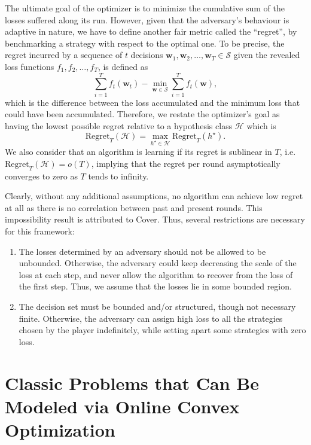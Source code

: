 \documentclass{article}
\begin{document}
The ultimate goal of the optimizer is to minimize the cumulative sum of the losses suffered along its run. However, given that the adversary's behaviour is adaptive in nature, we have to define another fair metric called the ``regret'', by benchmarking a strategy with respect to the optimal one.
To be precise, the regret incurred by a sequence of $t$ decisions $\textbf{w}_1, \textbf{w}_2, \ldots, \textbf{w}_T\in\mathcal{S}$ given the revealed loss functions $f_1, f_2, \ldots, f_T$, is defined as \[\sum\limits_{i=1}^T f_t(\textbf{w}_t)-\min\limits_{\textbf{w}\in\mathcal{S}} \sum\limits_{i=1}^T f_t(\textbf{w}),\] which is the difference between the loss accumulated and the minimum loss that could have been accumulated.
Therefore, we restate the optimizer's goal as having the lowest possible regret relative to a hypothesis class $\mathcal{H}$ which is \[\text{Regret}_T(\mathcal{H})=\max_{h^\star \in\mathcal{H}} \text{Regret}_T(h^\star).\]
We also consider that an algorithm is learning if its regret is sublinear in $T$, i.e. $\text{Regret}_T(\mathcal{H})=o(T)$, implying that the regret per round asymptotically converges to zero as $T$ tends to infinity.

Clearly, without any additional assumptions, no algorithm can achieve low regret at all as there is no correlation between past and present rounds.
This impossibility result is attributed to Cover.
Thus, several restrictions are necessary for this framework:
\begin{enumerate}[label=\textbf{\textit{Ass.} \arabic*}:]
  \item The losses determined by an adversary should not be allowed to be unbounded. Otherwise, the adversary could keep decreasing the scale of the loss at each step, and never allow  the algorithm to recover from the loss of the first step. Thus, we assume that the losses lie in some bounded region.
  \item The decision set must be bounded and/or structured, though not necessary finite. Otherwise, the adversary can assign high loss to all the strategies chosen by the player indefinitely, while setting apart some strategies with zero loss.
\end{enumerate}



\section{Classic Problems that Can Be Modeled via Online Convex Optimization}
\end{document}
